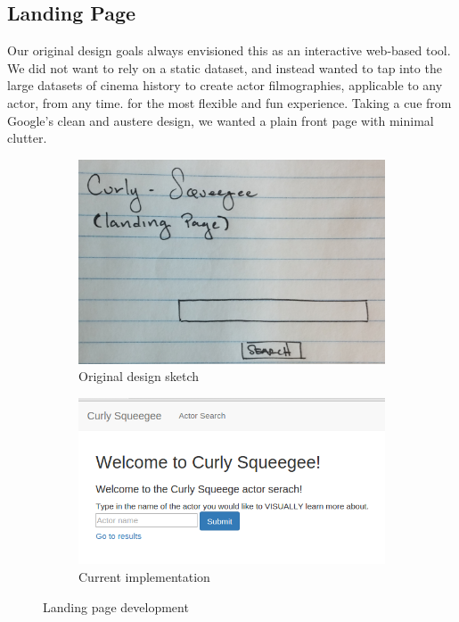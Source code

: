 \documentclass[12pt]{article}
\begin{document}
\subsection{Landing Page}

Our original design goals always envisioned this as an interactive web-based tool.  We did not want to rely on a static dataset, and instead wanted to tap into the large datasets of cinema history to create actor filmographies, applicable to any actor, from any time. for the most flexible and fun experience.   Taking a cue from Google's clean and austere design, we wanted a plain front page with minimal clutter.  
	\begin{figure}[h!]
		\centering
		\begin{subfigure}[t]{.5\textwidth}
			  \centering
			  \includegraphics[width=\linewidth]{images/landingPage_crop.png}
			  \caption{Original design sketch}
			  \label{fig:sub1}
		\end{subfigure}%
		\begin{subfigure}[t]{.8\textwidth}
			  \centering
			  \includegraphics[width=0.75\linewidth]{images/landingPage.png}
			  \caption{Current implementation}
			  \label{fig:sub2}
		\end{subfigure}%
		\caption{Landing page development}
		\label{fig:landingPage}
	\end{figure}
\end{document}
